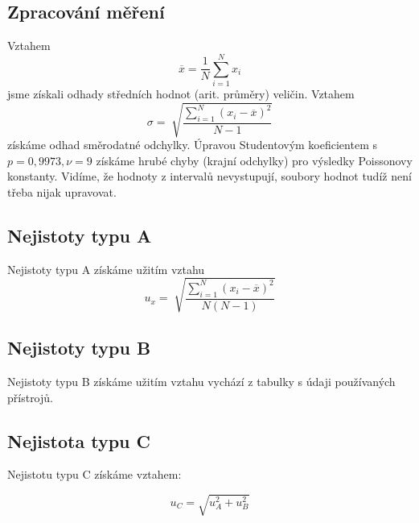 \documentclass[czech,11pt,a4paper]{article}
\begin{document}
	\subsection{Zpracování měření}
	Vztahem \begin{equation}
		\overline{x} = \frac{1}{N} \sum_{i=1}^{N} x_i
	\end{equation}
	jsme získali odhady středních hodnot (arit. průměry) veličin. 
	Vztahem
	\begin{equation}
		\sigma = \sqrt[]{\frac{\sum_{i =1}^N{ (x_i - \overline{x} )^2} }{N-1}}
	\end{equation}
	získáme odhad směrodatné odchylky. Úpravou Studentovým koeficientem s $p = 0,9973, \nu = 9$ získáme hrubé chyby (krajní odchylky) pro výsledky Poissonovy konstanty.
    Vidíme, že hodnoty z intervalů nevystupují, soubory hodnot tudíž není třeba nijak upravovat.	
	
	\subsection{Nejistoty typu A}
	Nejistoty typu A získáme užitím vztahu
	\begin{equation}
		u_x = \sqrt[]{\frac{\sum_{i =1}^N{ (x_i - \overline{x} )^2} }{N(N-1)}}
	\end{equation}
	
	
	
	\subsection{Nejistoty typu B}
	Nejistoty typu B získáme užitím vztahu vychází z tabulky s údaji používaných přístrojů.
	
	
	
	\subsection{Nejistota typu C}
	Nejistotu typu C získáme vztahem:
	
	\begin{equation}
		u_C = \sqrt{u_A ^2 + u_B ^2}
	\end{equation}
	
\end{document}
